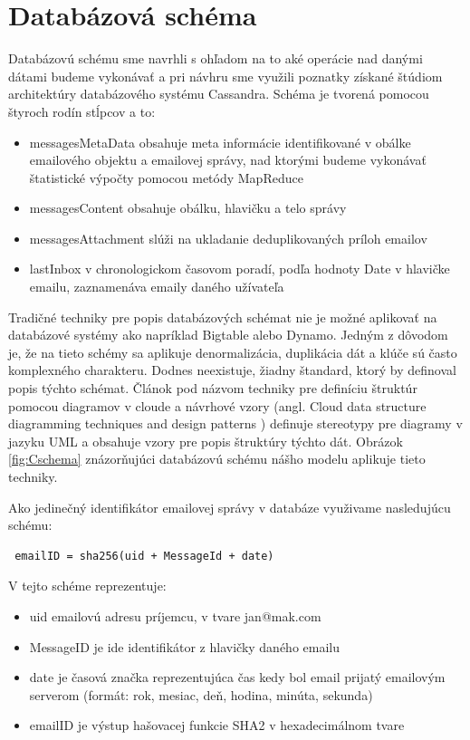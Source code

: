 \documentclass[11pt,twoside,a4paper]{book}
\begin{document}

\section{Databázová schéma}

Databázovú schému sme navrhli s ohľadom na to aké operácie nad danými dátami budeme vykonávať a pri návhru sme využili poznatky získané štúdiom architektúry databázového systému Cassandra. Schéma je tvorená pomocou štyroch rodín stĺpcov a to:

\begin{itemize}
 \item messagesMetaData obsahuje meta informácie identifikované v obálke emailového objektu a emailovej správy, nad ktorými budeme vykonávať štatistické výpočty pomocou metódy MapReduce
 \item messagesContent obsahuje obálku, hlavičku a telo správy
 \item messagesAttachment slúži na ukladanie deduplikovaných príloh emailov  
 \item lastInbox v chronologickom časovom poradí, podľa hodnoty Date v hlavičke emailu, zaznamenáva emaily daného užívateľa
\end{itemize}

Tradičné techniky pre popis databázových schémat nie je možné aplikovať na databázové systémy ako napríklad Bigtable alebo Dynamo. Jedným z dôvodom je, že na tieto schémy sa aplikuje denormalizácia, duplikácia dát a klúče sú často komplexného charakteru. Dodnes neexistuje, žiadny štandard, ktorý by definoval popis týchto schémat. Článok pod názvom techniky pre definíciu štruktúr pomocou diagramov v cloude a návrhové vzory (angl. Cloud data structure diagramming techniques and design patterns \cite{CloudDataStructureDiag}) definuje stereotypy pre diagramy v jazyku UML a obsahuje vzory pre popis štruktúry týchto dát. Obrázok \ref{fig:Cschema} znázorňujúci databázovú schému nášho modelu aplikuje tieto techniky.

Ako jedinečný identifikátor emailovej správy v databáze využivame nasledujúcu schému:
\begin{verbatim}
 emailID = sha256(uid + MessageId + date)
\end{verbatim}

V tejto schéme reprezentuje:
\begin{itemize}
 \item uid emailovú adresu príjemcu, v tvare jan@mak.com
 \item MessageID je ide identifikátor z hlavičky daného emailu
 \item date je časová značka reprezentujúca čas kedy bol email prijatý emailovým serverom (formát: rok, mesiac, deň, hodina, minúta, sekunda)
 \item emailID je výstup hašovacej funkcie SHA2 v hexadecimálnom tvare
\end{itemize}
\end{document}
